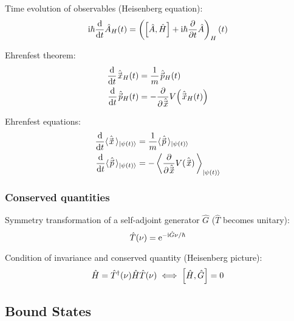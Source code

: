			\noindent
			Time evolution of observables (Heisenberg equation):
			\begin{equation}
				\mathrm{i}\hbar \dv{t} \hat{A}_H(t) = \left(\left[\hat{A}, \hat{H}\right] + \mathrm{i}\hbar \pdv{t} \hat{A}\right)_H (t)
			\end{equation}

			\noindent
			Ehrenfest theorem:
			\begin{equation}
				\begin{aligned}
					\dv{t} \hat{\vec{x}}_H(t) &= \frac{1}{m}\hat{\vec{p}}_H(t) \\
					\dv{t} \hat{\vec{p}}_H(t) &= - \pdv{\hat{\vec{x}}} V \qty(\hat{\vec{x}}_H(t)) \\
				\end{aligned}
			\end{equation}

			\noindent
			Ehrenfest equations:
			\begin{equation}
				\begin{aligned}
					\dv{t} \langle \hat{\vec{x}} \,\rangle_{\Ket{\psi(t)}} &= \frac{1}{m} \langle \hat{\vec{p}} \,\rangle_{\Ket{\psi(t)}} \\
					\dv{t} \langle \hat{\vec{p}} \,\rangle_{\Ket{\psi(t)}} &= - \left\langle \pdv{\hat{\vec{x}}} V(\hat{\vec{x}}) \,\right\rangle_{\Ket{\psi(t)}} \\
				\end{aligned}
			\end{equation}

		\subsubsection{Conserved quantities}
			\noindent
			Symmetry transformation of a self-adjoint generator $\hat{G}$ ($\hat{T}$ becomes unitary):
			\begin{equation}
				\hat{T}(\nu) = \mathrm{e}^{-\mathrm{i}\hat{G}\nu/\hbar}
			\end{equation}

			\noindent
			Condition of invariance  and conserved quantity (Heisenberg picture):
			\begin{equation}
				\hat{H} =\hat{T}^\dagger(\nu)\hat{H} \hat{T}(\nu) \iff \comm{\hat{H}}{\hat{G}} = 0
			\end{equation}

	\subsection{Bound States}
